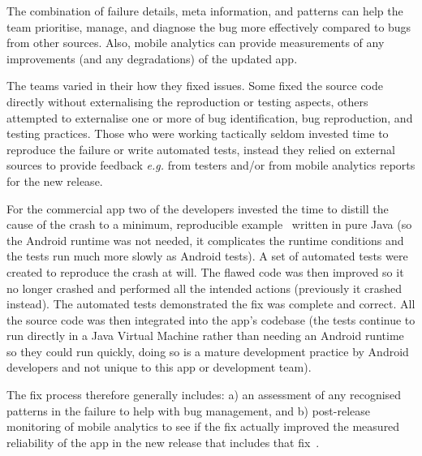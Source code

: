 The combination of failure details, meta information, and patterns can help the team prioritise, manage, and diagnose the bug more effectively compared to bugs from other sources. Also, mobile analytics can provide measurements of any improvements (and any degradations) of the updated app.

The teams varied in their how they fixed issues. Some fixed the source code directly without externalising the reproduction or testing aspects, others attempted to externalise one or more of bug identification, bug reproduction, and testing practices. Those who were working tactically seldom invested time to reproduce the failure or write automated tests, instead they relied on external sources to provide feedback \emph{e.g.} from testers and/or from mobile analytics reports for the new release.  

For the commercial app two of the developers invested the time to distill the cause of the crash to a minimum, reproducible example~ written in pure Java (so the Android runtime was not needed, it complicates the runtime conditions and the tests run much more slowly as Android tests). A set of automated tests were created to reproduce the crash at will. The flawed code was then improved so it no longer crashed and performed all the intended actions (previously it crashed instead). The automated tests demonstrated the fix was complete and correct. All the source code was then integrated into the app's codebase (the tests continue to run directly in a Java Virtual Machine rather than needing an Android runtime so they could run quickly, doing so is a mature development practice by Android developers and not unique to this app or development team).


The fix process therefore generally includes: a) an assessment of any recognised patterns in the failure to help with bug management, and b) post-release monitoring of mobile analytics to see if the fix actually improved the measured reliability of the app in the new release that includes that fix~. 

